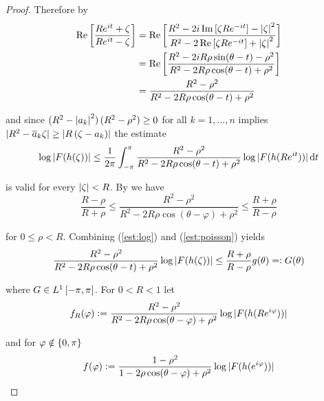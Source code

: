 \begin{proof}
	Therefore by
	\begin{equation*}
		\begin{aligned}
			\Re \sbr[3]{\frac{R e^{it} + \zeta}{R e^{it} - \zeta}} &= \Re \sbr[3]{\frac{R^2 - 2i \Im \sbr[0]{ \zeta R e^{-it} } - \abs[0]{ \zeta }^2}{R^2 - 2\Re \sbr[0]{ \zeta R e^{-it} } + \abs[0]{ \zeta }^2}}\\ &= \Re \sbr[3]{\frac{R^2 - 2iR\rho \sin( \theta - t ) - \rho^2 }{R^2 - 2R\rho \cos( \theta - t ) + \rho^2}}\\
			&= \frac{R^2 - \rho^2}{R^2 - 2R\rho \cos( \theta - t ) + \rho^2}
		\end{aligned}
	\end{equation*}

	\noindent and since $\del[0]{ R^2 - \abs[0]{ a_k }^2 }\del[0]{ R^2 - \rho^2 }\geq 0$ for all $k = 1,\dots,n$ implies $\abs[0]{ R^2 - \overline{a}_k\zeta } \geq \abs[0]{ R\del[0]{ \zeta - a_k}}$ the estimate 
	\begin{equation}
		\log\abs[0]{ F(h(\zeta))} \leq \frac{1}{2\pi}\int_{-\pi}^\pi \frac{R^2 - \rho^2}{R^2 - 2R\rho \cos( \theta - t ) + \rho^2}\log\abs[0]{ F(h(R e^{it}))}\d t
	\end{equation}

	\noindent is valid for every $\abs[0]{ \zeta } < R$. By \cite[236]{rudin:rc_analysis:1987} we have
	\begin{equation}
		\frac{R - \rho}{R + \rho} \leq \frac{R^2 - \rho^2}{R^2 - 2R\rho\cos(\theta - \varphi) + \rho^2} \leq \frac{R + \rho}{R - \rho}
		\label{est:poisson}
	\end{equation}
	
	\noindent for $0 \leq \rho < R$. Combining (\ref{est:log}) and (\ref{est:poisson}) yields 
\begin{equation}
	\frac{R^2 - \rho^2}{R^2 - 2R\rho \cos( \theta - t ) + \rho^2}\log\abs[0]{ F(h(\zeta))} \leq \frac{R + \rho}{R - \rho}g( \theta ) =: G( \theta )
\end{equation}

\noindent where $G \in L^1\intcc{-\pi,\pi}$. For $0 < R < 1$ let
\begin{equation*}
	f_R(\varphi) := \frac{R^2 - \rho^2}{R^2 - 2R\rho\cos(\theta - \varphi) + \rho^2}\log\abs[0]{ F(h(Re^{i\varphi}))}
\end{equation*}

\noindent and for $\varphi \notin \cbr[0]{ 0,\pi}$
\begin{equation*}
	f(\varphi) := \frac{1 - \rho^2}{1 - 2\rho\cos(\theta - \varphi) + \rho^2}\log\abs[0]{ F(h(e^{i\varphi}))}
\end{equation*}


\end{proof}
